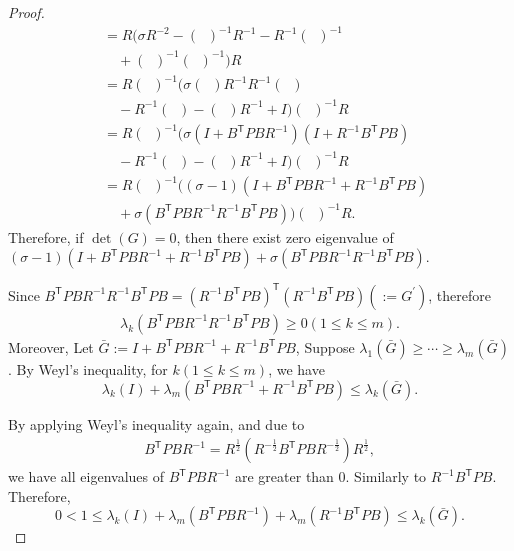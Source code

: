 \documentclass[letterpaper, 10 pt, conference]{ieeeconf}  %
\newcommand{\transpose}{\mathsf{T}}
\DeclareMathOperator{\tempRBP}{R + B^{\transpose}PB}
\begin{document}
\begin{proof}
\begin{align*}
        &= R\bigg(\sigma R^{-2}- (\tempRBP)^{-1}R^{-1} - R^{-1}(\tempRBP)^{-1}\\
        &\quad + (\tempRBP)^{-1}(\tempRBP)^{-1} \bigg)R\\
        &= R(\tempRBP)^{-1}\bigg(\sigma(\tempRBP)R^{-1}R^{-1}(\tempRBP) \\
        &\quad - R^{-1}(\tempRBP) - (\tempRBP)R^{-1} + I \bigg)(\tempRBP)^{-1}R\\
        &= R(\tempRBP)^{-1}\bigg(\sigma(I+B^{\transpose}PBR^{-1})(I+R^{-1}B^{\transpose}PB)\\
        &\quad  - R^{-1}(\tempRBP) - (\tempRBP)R^{-1} + I \bigg)(\tempRBP)^{-1}R\\
        &= R(\tempRBP)^{-1}\bigg((\sigma-1)(I+B^{\transpose}PBR^{-1}+R^{-1}B^{\transpose}PB)\\
        &\quad  + \sigma(B^{\transpose}PBR^{-1}R^{-1}B^{\transpose}PB)\bigg)(\tempRBP)^{-1}R.
    \end{align*}
    Therefore, if $\det(G) = 0$, then there exist zero eigenvalue of $(\sigma-1)(I+B^{\transpose}PBR^{-1}+R^{-1}B^{\transpose}PB) + \sigma(B^{\transpose}PBR^{-1}R^{-1}B^{\transpose}PB)$.

    Since $B^{\transpose}PBR^{-1}R^{-1}B^{\transpose}PB = (R^{-1}B^{\transpose}PB)^{\transpose}(R^{-1}B^{\transpose}PB)(:= G^{'})$, therefore
    \begin{align*}
        \lambda_{k}(B^{\transpose}PBR^{-1}R^{-1}B^{\transpose}PB) \geq 0(1\leq k \leq m).
    \end{align*}
    Moreover, Let $\bar{G} := I+B^{\transpose}PBR^{-1}+R^{-1}B^{\transpose}PB$, 
    Suppose $\lambda_{1}(\bar{G}) \geq \cdots \geq \lambda_{m}(\bar{G})$. By Weyl's inequality, for $k(1\leq k \leq m)$, we have
    \begin{equation}\label{eq:eigenStep3}
        \lambda_{k}(I) + \lambda_{m}(B^{\transpose}PBR^{-1}+R^{-1}B^{\transpose}PB) \leq \lambda_{k}(\bar{G}).
    \end{equation}
    
    By applying Weyl's inequality again, and due to 
    \begin{align*}
        B^{\transpose}PBR^{-1} = R^{\frac{1}{2}}(R^{-\frac{1}{2}}B^{\transpose}PBR^{-\frac{1}{2}})R^{\frac{1}{2}},
    \end{align*}
    we have all eigenvalues of $B^{\transpose}PBR^{-1}$ are greater than 0. Similarly to $R^{-1}B^{\transpose}PB$.
    Therefore,
    \begin{equation}\label{eq:eigenStep4}
        0 < 1 \leq \lambda_{k}(I) + \lambda_{m}(B^{\transpose}PBR^{-1})+\lambda_{m}(R^{-1}B^{\transpose}PB) \leq \lambda_{k}(\bar{G}).
    \end{equation}


\end{proof}
\end{document}
